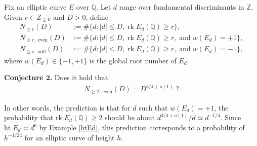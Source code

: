 \documentclass[12pt,reqno]{amsart}
\numberwithin{equation}{section}
\def\Z{{\mathbb Z}}
\def\Q{{\mathbb Q}}
\begin{document}
Fix an elliptic curve $E$ over $\Q$. Let $d$ range over fundamental discriminants in $\Z$. Given $r \in Z_{\ge 0}$ and $D>0$, define
\begin{align*}
N_{\ge r}(D)&:= \# \{d: |d| \le D, \; \text{rk} \; E_d(\Q) \ge r \},\\
N_{\ge r, \; \text{even}}(D)&:= \# \{d: |d| \le D, \; \text{rk} \; E_d(\Q) \ge r, \;\text{and} \; w(E_d) = +1 \}, \\
N_{\ge r, \; \text{odd}}(D)&:= \# \{d: |d| \le D, \; \text{rk} \; E_d(\Q) \ge r, \;\text{and} \; w(E_d) = -1 \},
\end{align*}
where $w(E_d) \in \{-1, +1\}$ is the global root number of $E_d$.

\smallskip
{\bf Conjecture $\mathbf{2}$.} Does it hold that
\begin{align*}
N_{\ge 2, \; \text{even}}(D) = D^{3/4 +o(1)}\; ?
\end{align*}

\smallskip

In other words, the prediction is that for $d$ such that $w(E_d) = +1$, the probability that $\text{rk} \; E_d(\Q) \ge 2$ should be about $d^{3/4+o(1)}/d \simeq d^{-1/4}$. Since $\text{ht} \; E_d \asymp d^6$ by Example \ref{htEd}, this prediction corresponds to a probability of $h^{-1/24}$ for an elliptic curve of height $h$.

\smallskip
\end{document}
